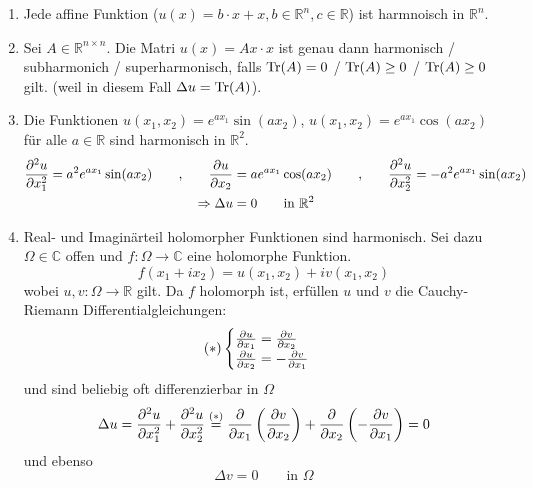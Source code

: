 \begin{beispiele}
	\begin{enumerate}[1.]
		\item Jede affine Funktion ($u(x) = b \cdot x + x, b \in \mathbb{R}^n , c \in \mathbb{R}$) ist harmnoisch in $\mathbb{R}^n$.
		\item Sei $A \in \mathbb{R}^{n \times n}$. Die Matri $u(x) = Ax \cdot x$ ist genau dann harmonisch / subharmonich / superharmonisch, falls $ \operatorname{Tr}(A)= 0$ / $ \operatorname{Tr}(A) \geq  0 $ / $ \operatorname{Tr}(A) \geq  0 $ gilt. (weil in diesem Fall $\Delta u = \operatorname{Tr}(A)$).
		\item Die Funktionen $u(x_1,x_2)= e^{ax_1}\sin(ax_2)$, $u(x_1,x_2)= e^{ax_1} \cos(ax_2)$ für alle $a \in \mathbb{R}$ sind harmonisch in $\mathbb{R}^2$.
		\begin{align}
			\frac{{\partial ^2u}}{{\partial x_1^2}}  = a^2 e^{ax_1} \sin(ax_2) \qquad \text{,} \qquad \frac{{\partial u}}{{\partial x_2}}  &= a e^{ax_1} \cos(ax_2) 
			\qquad \text{,} \qquad \frac{{\partial ^2u}}{{\partial x_2^2}}  = - a^2 e^{ax_1} \sin(ax_2)  \\
			\Rightarrow \Delta u &= 0 \qquad \text{in } \mathbb{R}^2
		\end{align}
		\item Real- und Imaginärteil holomorpher Funktionen sind harmonisch. Sei dazu $\Omega \in \mathbb{C}$ offen und $f: \Omega \to \mathbb{C}$ eine holomorphe Funktion.
		\begin{equation}
			f ( x_1 + i x_2) = u(x_1,x_2) + i v(x_1,x_2) 
		\end{equation}
		wobei $u,v : \Omega \to  \mathbb{R}$ gilt. Da $f$ holomorph ist, erfüllen $u$ und $v$ die Cauchy-Riemann Differentialgleichungen:
		\begin{align}
			(*)
			\begin{cases}
				\frac{{\partial u}}{{\partial x_1}} = \frac{{\partial v}}{{\partial x_2}}  \\
				\frac{{\partial u}}{{\partial x_2}} = -\frac{{\partial v}}{{\partial x_1}} 	\label{(stern)}
			\end{cases}
		\end{align}
		und sind beliebig oft differenzierbar in $\Omega$
		\begin{equation}
			\Delta u = \frac{{\partial ^2u}}{{\partial x_1^2}}  + \frac{{\partial ^2u}}{{\partial x_2^2}}  \stackrel{(*)}{=} \frac{{\partial }}{{\partial x_1}}  \left( \frac{{\partial v}}{{\partial x_2}}  \right) + \frac{{\partial }}{{\partial x_2}}  \left( - \frac{{\partial v}}{{\partial x_1}}  \right) = 0
		\end{equation}
		und ebenso
		\[
			\Delta v = 0 \qquad \text{in } \Omega
		\]
	\end{enumerate}
\end{beispiele}

